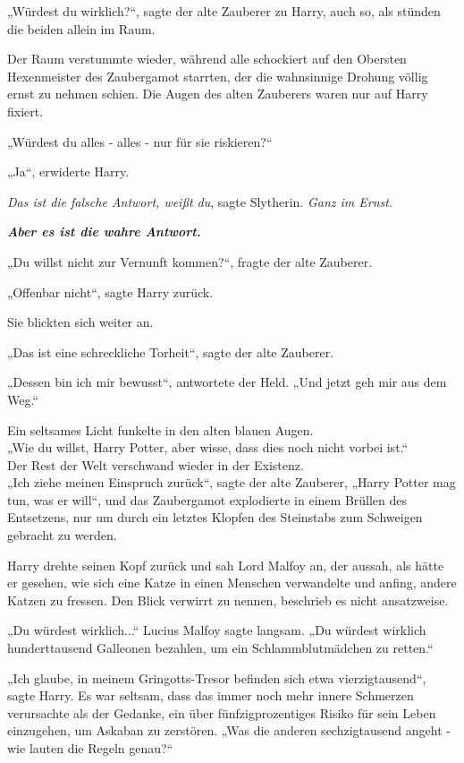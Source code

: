 {„Würdest du wirklich?“, sagte der alte Zauberer zu Harry, auch so, als stünden die beiden allein im Raum.

Der Raum verstummte wieder, während alle schockiert auf den Obersten Hexenmeister des Zaubergamot starrten, der die wahnsinnige Drohung völlig ernst zu nehmen schien. Die Augen des alten Zauberers waren nur auf Harry fixiert.

„Würdest du alles - alles - nur für sie riskieren?“

„Ja“, erwiderte Harry.

\emph{Das ist die falsche Antwort, weißt du}, sagte Slytherin. \emph{Ganz im Ernst}.

\textbf{\emph{Aber es ist die wahre Antwort.}}

„Du willst nicht zur Vernunft kommen?“, fragte der alte Zauberer.

„Offenbar nicht“, sagte Harry zurück.

Sie blickten sich weiter an.

„Das ist eine schreckliche Torheit“, sagte der alte Zauberer.

„Dessen bin ich mir bewusst“, antwortete der Held. „Und jetzt geh mir aus dem Weg.“

Ein seltsames Licht funkelte in den alten blauen Augen.\\ „Wie du willst, Harry Potter, aber wisse, dass dies noch nicht vorbei ist.“\\ Der Rest der Welt verschwand wieder in der Existenz.\\ „Ich ziehe meinen Einspruch zurück“, sagte der alte Zauberer, „Harry Potter mag tun, was er will“, und das Zaubergamot explodierte in einem Brüllen des Entsetzens, nur um durch ein letztes Klopfen des Steinstabs zum Schweigen gebracht zu werden.

Harry drehte seinen Kopf zurück und sah Lord Malfoy an, der aussah, als hätte er gesehen, wie sich eine Katze in einen Menschen verwandelte und anfing, andere Katzen zu fressen. Den Blick verwirrt zu nennen, beschrieb es nicht ansatzweise.

„Du würdest wirklich...“ Lucius Malfoy sagte langsam. „Du würdest wirklich hunderttausend Galleonen bezahlen, um ein Schlammblutmädchen zu retten.“

„Ich glaube, in meinem Gringotts-Tresor befinden sich etwa vierzigtausend“, sagte Harry. Es war seltsam, dass das immer noch mehr innere Schmerzen verursachte als der Gedanke, ein über fünfzigprozentiges Risiko für sein Leben einzugehen, um Askaban zu zerstören. „Was die anderen sechzigtausend angeht - wie lauten die Regeln genau?“

}
